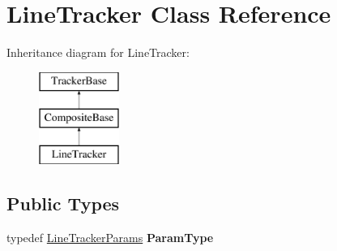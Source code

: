 \hypertarget{classLineTracker}{\section{Line\-Tracker Class Reference}
\label{classLineTracker}
}
Inheritance diagram for Line\-Tracker\-:\begin{figure}[H]
\begin{center}
\leavevmode
\includegraphics[height=3.000000cm]{classLineTracker}
\end{center}
\end{figure}
\subsection*{Public Types}
\begin{DoxyCompactItemize}
\item 
\hypertarget{classLineTracker_a74f938bb06c9de06411830651c7fa6cf}{typedef \hyperlink{structLineTrackerParams}{Line\-Tracker\-Params} {\bfseries Param\-Type}}\label{classLineTracker_a74f938bb06c9de06411830651c7fa6cf}

\end{DoxyCompactItemize}
